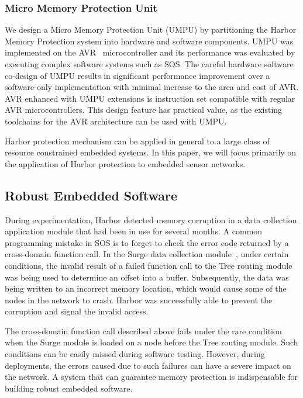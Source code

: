 \subsubsection{Micro Memory Protection Unit}
%
We design a Micro Memory Protection Unit (UMPU) by partitioning the
Harbor Memory Protection system into hardware and software components.
%
UMPU was implemented on the AVR~\cite{avrdatasheet} microcontroller and
its performance was evaluated by executing complex software systems
such as SOS.
%
The careful hardware software co-design of UMPU results in significant
performance improvement over a software-only implementation with minimal
increase to the area and cost of AVR.
%
AVR enhanced with UMPU extensions is instruction set compatible with
regular AVR microcontrollers.
%
This design feature has practical value, as the existing
toolchains for the AVR architecture can be used with UMPU.
%
%
%

Harbor protection mechanism can be applied in general to a large class
of resource constrained embedded systems.
%
In this paper, we will focus primarily on the application of Harbor
protection to embedded sensor networks.
%
%
\subsection{Robust Embedded Software}
%
During experimentation, Harbor detected memory corruption in a data
collection application module that had been in use for several months.
%
A common programming mistake in SOS is to forget to check the error code
returned by a cross-domain function call.
%
In the Surge data collection module~\cite{woo03surge}, under certain
conditions, the invalid result of a failed function call to the Tree
routing module was being used to determine an offset into a buffer.
%
Subsequently, the data was being written to an incorrect memory
location, which would cause some of the nodes in the network to crash.
%
Harbor was successfully able to prevent the corruption and signal the
invalid access.
%


The cross-domain function call described above fails under the rare
condition when the Surge module is loaded on a node before the Tree
routing module.
%
Such conditions can be easily missed during software testing.
%
However, during deployments, the errors caused due to such failures
can have a severe impact on the network.
%
A system that can guarantee memory protection is indispensable for
building robust embedded software.
%
%


